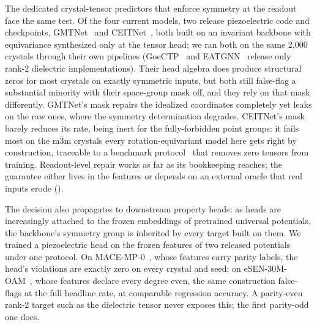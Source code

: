 The dedicated crystal-tensor predictors that enforce symmetry at the readout face the same test. Of the four current models, two release piezoelectric code and checkpoints, GMTNet~\cite{yan2024gmtnet} and CEITNet~\cite{ceitnet2026}, both built on an invariant backbone with equivariance synthesized only at the tensor head; we ran both on the same 2,000 crystals through their own pipelines (GoeCTP~\cite{goectp2024} and EATGNN~\cite{lu2025eatgnn} release only rank-2 dielectric implementations). Their head algebra does produce structural zeros for most crystals on exactly symmetric inputs, but both still false-flag a substantial minority with their space-group mask off, and they rely on that mask differently. GMTNet's mask repairs the idealized coordinates completely yet leaks on the raw ones, where the symmetry determination degrades. CEITNet's mask barely reduces its rate, being inert for the fully-forbidden point groups: it fails most on the m$\bar 3$m crystals every rotation-equivariant model here gets right by construction, traceable to a benchmark protocol~\cite{choudhary2020jarvis} that removes zero tensors from training. Readout-level repair works as far as its bookkeeping reaches; the guarantee either lives in the features or depends on an external oracle that real inputs erode ().

The decision also propagates to downstream property heads: as heads are increasingly attached to the frozen embeddings of pretrained universal potentials, the backbone's symmetry group is inherited by every target built on them. We trained a piezoelectric head on the frozen features of two released potentials under one protocol. On MACE-MP-0~\cite{batatia2023foundation}, whose features carry parity labels, the head's violations are exactly zero on every crystal and seed; on eSEN-30M-OAM~\cite{barrosoluque2024omat24}, whose features declare every degree even, the same construction false-flags at the full headline rate, at comparable regression accuracy. A parity-even rank-2 target such as the dielectric tensor never exposes this; the first parity-odd one does.
